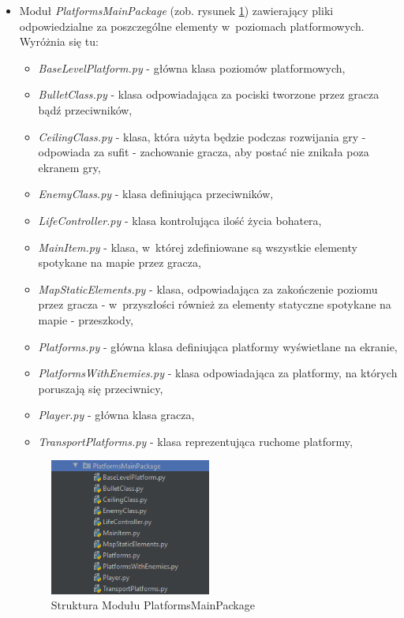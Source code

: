 \documentclass[12pt,a4paper,oneside]{book}
\theoremstyle{definition}
\numberwithin{equation}{chapter}
\begin{document}
\begin{itemize}
            \item Moduł \textit{PlatformsMainPackage} (zob. rysunek \ref{StrukturaPlatforms}) zawierający pliki odpowiedzialne za poszczególne elementy w~poziomach platformowych. Wyróżnia się tu:
        \begin{itemize}
            \item \textit{BaseLevelPlatform.py} - główna klasa poziomów platformowych,
            \item \textit{BulletClass.py} - klasa odpowiadająca za pociski tworzone przez gracza bądź przeciwników,
            \item \textit{CeilingClass.py} - klasa, która użyta będzie podczas rozwijania gry - odpowiada za sufit - zachowanie gracza, aby postać nie znikała poza ekranem gry,
            \item \textit{EnemyClass.py} - klasa definiująca przeciwników,
            \item \textit{LifeController.py} - klasa kontrolująca ilość życia bohatera,
            \item \textit{MainItem.py} - klasa, w~której zdefiniowane są wszystkie elementy spotykane na mapie przez gracza,
            \item \textit{MapStaticElements.py} - klasa, odpowiadająca za zakończenie poziomu przez gracza - w~przyszłości również za elementy statyczne spotykane na mapie - przeszkody,
            \item \textit{Platforms.py} - główna klasa definiująca platformy wyświetlane na ekranie,
            \item \textit{PlatformsWithEnemies.py} - klasa odpowiadająca za platformy, na których poruszają się przeciwnicy,
            \item \textit{Player.py} - główna klasa gracza,
            \item \textit{TransportPlatforms.py} - klasa reprezentująca ruchome platformy,
        \end{itemize}
        \begin{figure}[hpt!]
            \centering
            \includegraphics[width=0.5\textwidth]{ProjectStructure/strukturaplatforms.png}
            \caption{Struktura Modułu PlatformsMainPackage}
            \label{StrukturaPlatforms}
        \end{figure}
\newpage


\end{itemize}
\end{document}
